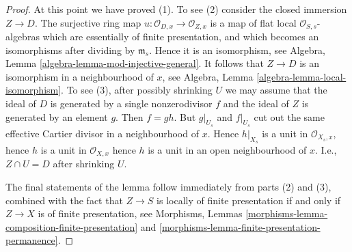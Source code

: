 \documentclass[10pt,a4paper]{amsart}
\theoremstyle{plain}
\theoremstyle{definition}
\theoremstyle{remark}
\numberwithin{equation}{subsection}
\begin{document}
\begin{proof}
\medskip\noindent
At this point we have proved (1). To see (2) consider the closed
immersion $Z \to D$. The surjective ring map
$u : \mathcal{O}_{D, x} \to \mathcal{O}_{Z, x}$
is a map of flat local $\mathcal{O}_{S, s}$-algebras which
are essentially of finite presentation, and which becomes an
isomorphisms after dividing by $\mathfrak m_s$. Hence it is
an isomorphism, see
Algebra, Lemma \ref{algebra-lemma-mod-injective-general}.
It follows that $Z \to D$ is an isomorphism in a neighbourhood
of $x$, see
Algebra, Lemma \ref{algebra-lemma-local-isomorphism}.
To see (3), after possibly shrinking $U$ we may assume that
the ideal of $D$ is generated by a single nonzerodivisor $f$
and the ideal of $Z$ is generated by an element $g$. Then
$f = gh$. But $g|_{U_s}$ and $f|_{U_s}$ cut out the same
effective Cartier divisor in a neighbourhood of $x$. Hence
$h|_{X_s}$ is a unit in $\mathcal{O}_{X_s, x}$, hence $h$ is
a unit in $\mathcal{O}_{X, x}$ hence $h$ is a unit in an
open neighbourhood of $x$. I.e., $Z \cap U = D$ after shrinking $U$.

\medskip\noindent
The final statements of the lemma follow immediately from
parts (2) and (3), combined with the fact that $Z \to S$
is locally of finite presentation if and only if $Z \to X$ is
of finite presentation, see
Morphisms, Lemmas \ref{morphisms-lemma-composition-finite-presentation} and
\ref{morphisms-lemma-finite-presentation-permanence}.
\end{proof}
\end{document}
